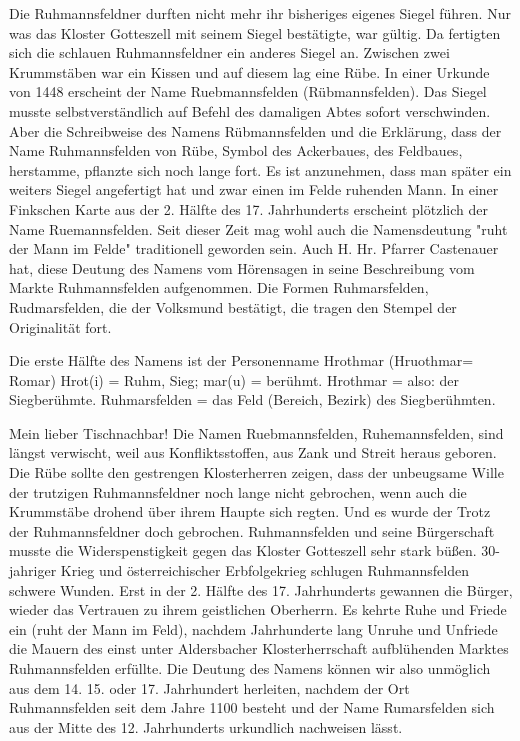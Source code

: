\documentclass{book}
\begin{document}
Die Ruhmannsfeldner durften nicht mehr ihr bisheriges eigenes Siegel führen. Nur
was das Kloster Gotteszell mit seinem Siegel bestätigte, war gültig. Da
fertigten sich die schlauen Ruhmannsfeldner ein anderes Siegel an. Zwischen zwei
Krummstäben war ein Kissen und auf diesem lag eine Rübe. In einer Urkunde von
1448 erscheint der Name Ruebmannsfelden (Rübmannsfelden). Das Siegel musste
selbstverständlich auf Befehl des damaligen Abtes sofort verschwinden. Aber die
Schreibweise des Namens Rübmannsfelden und die Erklärung, dass der Name
Ruhmannsfelden von Rübe, Symbol des Ackerbaues, des Feldbaues, herstamme,
pflanzte sich noch lange fort. Es ist anzunehmen, dass man später ein weiters
Siegel angefertigt hat und zwar einen im Felde ruhenden Mann. In einer Finkschen
Karte aus der 2. Hälfte des 17. Jahrhunderts erscheint plötzlich der Name
Ruemannsfelden. Seit dieser Zeit mag wohl auch die Namensdeutung "ruht der Mann
im Felde" traditionell geworden sein. Auch H. Hr. Pfarrer Castenauer hat, diese
Deutung des Namens vom Hörensagen in seine Beschreibung vom Markte
Ruhmannsfelden aufgenommen. Die Formen Ruhmarsfelden, Rudmarsfelden, die der
Volksmund bestätigt, die tragen den Stempel der Originalität fort.

Die erste Hälfte des Namens ist der Personenname Hrothmar (Hruothmar= Romar)
Hrot(i) = Ruhm, Sieg; mar(u) = berühmt. Hrothmar = also: der Siegberühmte.
Ruhmarsfelden = das Feld (Bereich, Bezirk) des Siegberühmten.

Mein lieber Tischnachbar! Die Namen Ruebmannsfelden, Ruhemannsfelden, sind
längst verwischt, weil aus Konfliktsstoffen, aus Zank und Streit heraus geboren.
Die Rübe sollte den gestrengen Klosterherren zeigen, dass der unbeugsame Wille
der trutzigen Ruhmannsfeldner noch lange nicht gebrochen, wenn auch die
Krummstäbe drohend über ihrem Haupte sich regten. Und es wurde der Trotz der
Ruhmannsfeldner doch gebrochen. Ruhmannsfelden und seine Bürgerschaft musste die
Widerspenstigkeit gegen das Kloster Gotteszell sehr stark büßen. 30-jahriger
Krieg und österreichischer Erbfolgekrieg schlugen Ruhmannsfelden schwere Wunden.
Erst in der 2. Hälfte des 17. Jahrhunderts gewannen die Bürger, wieder das
Vertrauen zu ihrem geistlichen Oberherrn. Es kehrte Ruhe und Friede ein (ruht
der Mann im Feld), nachdem Jahrhunderte lang Unruhe und Unfriede die Mauern des
einst unter Aldersbacher Klosterherrschaft aufblühenden Marktes Ruhmannsfelden
erfüllte. Die Deutung des Namens können wir also unmöglich aus dem 14. 15. oder
17. Jahrhundert herleiten, nachdem der Ort Ruhmannsfelden seit dem Jahre 1100
besteht und der Name Rumarsfelden sich aus der Mitte des 12. Jahrhunderts
urkundlich nachweisen lässt.
\end{document}
